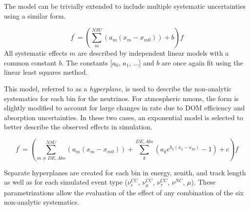 The model can be trivially extended to include multiple systematic uncertainties using a similar form.

\begin{equation}
\label{eq:hyperplane_nu}
	f^\prime = \left( \sum_{m}^{NSU} \left(a_m (x_m - x_{m0})\right) + b\right) f
\end{equation}
%
All systematic effects $m$ are described by independent linear models with a common constant $b$.
The constants [$a_0$, $a_1$, ...] and $b$ are once again fit using the linear least squares method.

This model, referred to as a \emph{hyperplane}, is used to describe the non-analytic systematics for each bin for the neutrinos.
For atmospheric muons, the form is slightly modified to account for large changes in rate due to DOM efficiency and absorption uncertainties.
In these two cases, an exponential model is selected to better describe the observed effects in simulation.

\begin{equation}
\label{eq:hyperplane_mu}
	f^\prime = 
	\left(\sum_{m\neq DE,Abs}^{NSU}\left(a_m (x_m-x_{m0})\right) + \sum_k^{DE,Abs}\left(a_k e^{b_k (x_k-x_{k0})} - 1\right) + c\right) f
\end{equation}

Separate hyperplanes are created for each bin in energy, zenith, and track length as well as for each simulated event type ($\nu^{CC}_e$, $\nu^{CC}_\mu$, $\nu^{CC}_\tau$, $\nu^{NC}$, $\mu$).
These parametrizations allow the evaluation of the effect of any combination of the six non-analytic systematics.


